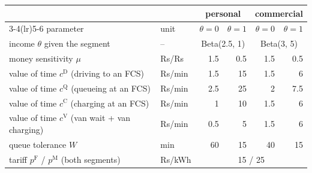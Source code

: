 \begin{tabular}{llrrrr}\toprule
 & & \multicolumn{2}{c}{personal} & \multicolumn{2}{c}{commercial} \\
\cmidrule(lr){3-4}\cmidrule(lr){5-6} parameter & unit & $\theta=0$ & $\theta=1$ & $\theta=0$ & $\theta=1$ \\ \midrule
income $\theta$ given the segment & -- & \multicolumn{2}{c}{Beta(2.5, 1)} & \multicolumn{2}{c}{Beta(3, 5)} \\
money sensitivity $\mu$ & Rs/Rs & 1.5 & 0.5 & 1.5 & 0.5 \\
value of time $c^{\mathrm{D}}$ (driving to an FCS) & Rs/min & 1.5 & 15 & 1.5 & 6 \\
value of time $c^{\mathrm{Q}}$ (queueing at an FCS) & Rs/min & 2.5 & 25 & 2 & 7.5 \\
value of time $c^{\mathrm{C}}$ (charging at an FCS) & Rs/min & 1 & 10 & 1.5 & 6 \\
value of time $c^{\mathrm{V}}$ (van wait + van charging) & Rs/min & 0.5 & 5 & 1.5 & 6 \\
queue tolerance $W$ & min & 60 & 15 & 40 & 15 \\
tariff $p^{\mathrm{F}}$ / $p^{\mathrm{M}}$ (both segments) & Rs/kWh & \multicolumn{4}{c}{15 / 25} \\
\bottomrule\end{tabular}

